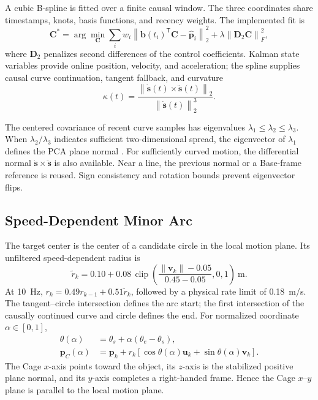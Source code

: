 \documentclass[conference]{IEEEtran}
\begin{document}
A cubic B-spline is fitted over a finite causal window. The three coordinates share timestamps, knots, basis functions, and recency weights. The implemented fit is
\begin{equation}
\mathbf C^{*}=\arg\min_{\mathbf C}
\sum_i w_i
\left\|\mathbf b(t_i)^{\mathsf T}\mathbf C-\hat{\mathbf p}_i\right\|_2^2
+\lambda\left\|\mathbf D_2\mathbf C\right\|_F^2 ,
\label{eq:spline}
\end{equation}
where $\mathbf D_2$ penalizes second differences of the control coefficients. Kalman state variables provide online position, velocity, and acceleration; the spline supplies causal curve continuation, tangent fallback, and curvature
\begin{equation}
\kappa(t)=
\frac{\left\|\dot{\mathbf s}(t)\times\ddot{\mathbf s}(t)\right\|_2}
{\left\|\dot{\mathbf s}(t)\right\|_2^3}.
\label{eq:curvature}
\end{equation}

The centered covariance of recent curve samples has eigenvalues
$\lambda_1\leq\lambda_2\leq\lambda_3$. When $\lambda_2/\lambda_3$ indicates sufficient two-dimensional spread, the eigenvector of $\lambda_1$ defines the PCA plane normal \cite{jolliffe2002}. For sufficiently curved motion, the differential normal $\dot{\mathbf s}\times\ddot{\mathbf s}$ is also available. Near a line, the previous normal or a Base-frame reference is reused. Sign consistency and rotation bounds prevent eigenvector flips.

\subsection{Speed-Dependent Minor Arc}

The target center is the center of a candidate circle in the local motion plane. Its unfiltered speed-dependent radius is
\begin{equation}
\tilde r_k=0.10+
0.08\,\operatorname{clip}\!\left(
\frac{\|\mathbf v_k\|-0.05}{0.45-0.05},0,1
\right)\ \mathrm{m}.
\label{eq:speed_radius}
\end{equation}
At 10~Hz, $r_k=0.49r_{k-1}+0.51\tilde r_k$, followed by a physical rate limit of 0.18~m/s. The tangent--circle intersection defines the arc start; the first intersection of the causally continued curve and circle defines the end. For normalized coordinate $\alpha\in[0,1]$,
\begin{align}
\theta(\alpha)&=\theta_s+\alpha(\theta_e-\theta_s),\nonumber\\
\mathbf p_C(\alpha)&=\mathbf p_k+r_k
\left[\cos\theta(\alpha)\mathbf u_k+
\sin\theta(\alpha)\mathbf v_k\right].
\label{eq:arc}
\end{align}
The Cage $x$-axis points toward the object, its $z$-axis is the stabilized positive plane normal, and its $y$-axis completes a right-handed frame. Hence the Cage $x$--$y$ plane is parallel to the local motion plane.
\end{document}
